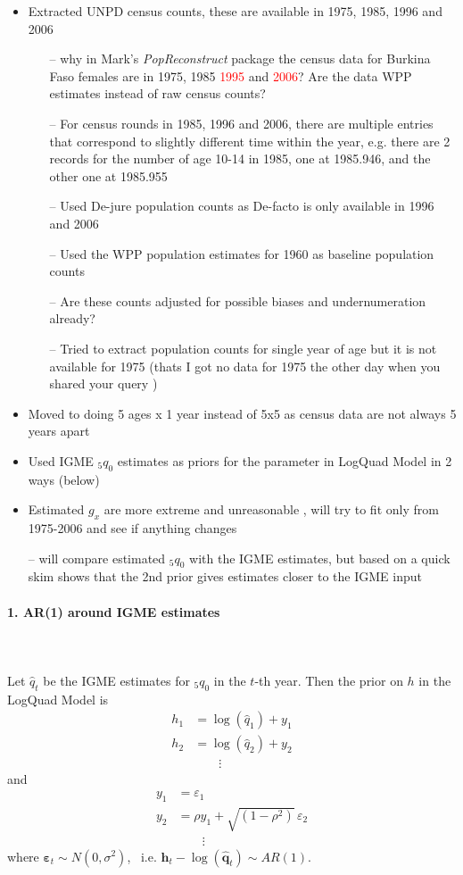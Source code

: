 \documentclass[12pt,a4paper]{article}
\date{\vspace{-5ex}}
\begin{document}
\begin{itemize}
\item Extracted UNPD census counts, these are available in 1975, 1985, 1996 and 2006
	\begin{itemize}
	\item[--] why in Mark's \textit{PopReconstruct} package the census data for Burkina Faso females are in 1975, 1985 \textcolor{red}{1995} and \textcolor{red}{2006}? Are the data WPP estimates instead of raw census counts?
	\item[--] For census rounds in 1985, 1996 and 2006, there are multiple entries that correspond to slightly different time within the year, e.g. there are 2 records for the number of age 10-14 in 1985, one at 1985.946, and the other one at 1985.955
	\item[--] Used De-jure population counts as De-facto is only available in 1996 and 2006
	\item[--] Used the WPP population estimates for 1960 as baseline population counts
	\item[--] Are these counts adjusted for possible biases and undernumeration already?
	\item[--] Tried to extract population counts for single year of age but it is not available for 1975 (thats I got no data for 1975 the other day when you shared your query )
	\end{itemize}
\item Moved to doing 5 ages x 1 year instead of 5x5 as census data are not always 5 years apart
\item Used IGME $_5q_0$ estimates as priors for the parameter in LogQuad Model in 2 ways (below)
\item Estimated $g_x$ are more extreme and unreasonable , will try to fit only from 1975-2006 and see if anything changes
\item[--] will compare estimated $_5q_0$ with the IGME estimates, but based on a quick skim shows that the 2nd prior gives estimates closer to the IGME input
\end{itemize}

\paragraph{1. AR(1) around IGME estimates} \\~\\
Let $\hat{q}_t$ be the IGME estimates for $_5q_0$ in the $t$-th year. Then the prior on $h$ in the LogQuad Model is
\begin{align*}
h_1 &= \log(\hat{q}_1) + y_1 \\
h_2 &= \log(\hat{q}_2) + y_2 \\
 & \qquad \vdots
\end{align*}
and
\begin{align*}
y_1 &= \varepsilon_1 \\
y_2 &= \rho y_1 + \sqrt{(1 - \rho^2)} \, \varepsilon_2 \\
 & \qquad \vdots
\end{align*}
where $ \boldsymbol{\varepsilon}_t \sim N(0, \sigma^2)$, \, i.e. $\boldsymbol{h}_t - \log(\boldsymbol{\hat{q}}_t) \sim AR(1)$.
\end{document}
